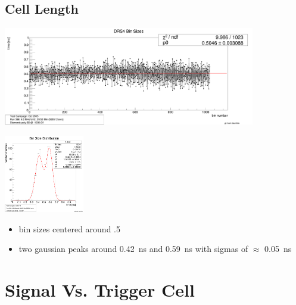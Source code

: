 \documentclass[9pt]{beamer}
\begin{document}
\subsection{Cell Length}
\begin{frame}
	\begin{center}
		\includegraphics[width=11cm]{DRSBinSizes}
	\end{center}
	\begin{minipage}{3.5cm}
		\centering
		\includegraphics[width=3.5cm]{BinDisto}
	\end{minipage}
	\hspace*{2pt}
	\begin{minipage}{7.5cm}
		\begin{itemize}
			\item bin sizes centered around .5
			\item two gaussian peaks around \SI{.42}{ns} and \SI{.59}{ns} with sigmas of $\approx$ \SI{.05}{ns}
		\end{itemize}
	\end{minipage}
\end{frame}
\section{Signal Vs. Trigger Cell}
\end{document}
